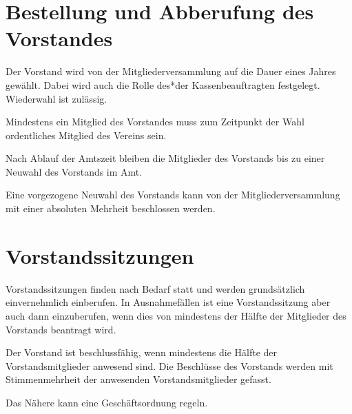 \section{Bestellung und Abberufung des Vorstandes}
\begin{absätze}
    \item Der Vorstand wird von der Mitgliederversammlung auf die Dauer eines Jahres gewählt. Dabei wird auch die Rolle des*der Kassenbeauftragten festgelegt. Wiederwahl ist zulässig.
    \item Mindestens ein Mitglied des Vorstandes muss zum Zeitpunkt der Wahl ordentliches Mitglied des Vereins sein.
    \item Nach Ablauf der Amtszeit bleiben die Mitglieder des Vorstands bis zu einer Neuwahl des Vorstands im Amt.
    \item Eine vorgezogene Neuwahl des Vorstands kann von der Mitgliederversammlung mit einer absoluten Mehrheit beschlossen werden.
\end{absätze}

\section{Vorstandssitzungen}
\begin{absätze}
    \item Vorstandssitzungen finden nach Bedarf statt und werden grundsätzlich einvernehmlich einberufen. In Ausnahmefällen ist eine Vorstandssitzung aber auch dann einzuberufen, wenn dies von mindestens der Hälfte der Mitglieder des Vorstands beantragt wird.
    \item Der Vorstand ist beschlussfähig, wenn mindestens die Hälfte der Vorstandsmitglieder anwesend sind. Die Beschlüsse des Vorstands werden mit Stimmenmehrheit der anwesenden Vorstandsmitglieder gefasst.
    \item Das Nähere kann eine Geschäftsordnung regeln.
\end{absätze}
